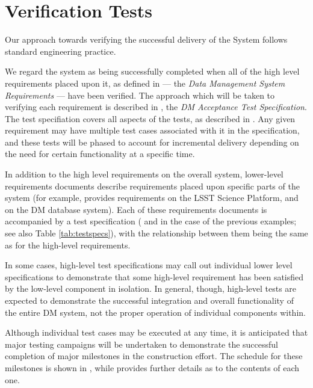 \section{Verification Tests \label{sect:approach}}

Our approach towards verifying the successful delivery of the \product{} System follows standard engineering practice.

We regard the system as being successfully completed when all of the high level requirements placed upon it, as defined in  --- the \emph{Data Management System Requirements} --- have been verified.
The approach which will be taken to verifying each requirement is described in , the \emph{DM Acceptance Test Specification}.
The test specifiation covers all aspects of the tests, as described in .
Any given requirement may have multiple test cases associated with it in the specification, and these tests will be phased to account for incremental delivery depending on the need for certain functionality at a specific time.

In addition to the high level requirements on the overall \product{} system, lower-level requirements documents describe requirements placed upon specific parts of the system (for example,  provides requirements on the LSST Science Platform, and  on the DM database system).
Each of these requirements documents is accompanied by a test specification ( and  in the case of the previous examples; see also Table \ref{tab:testspecs}), with the relationship between them being the same as for the high-level requirements.

In some cases, high-level test specifications may call out individual lower level specifications to demonstrate that some high-level requirement has been satisfied by the low-level component in isolation.
In general, though, high-level tests are expected to demonstrate the successful integration and overall functionality of the entire DM system, not the proper operation of individual components within.

Although individual test cases may be executed at any time, it is anticipated that major testing campaigns will be undertaken to demonstrate the successful completion of major milestones in the \product{} construction effort.
The schedule for these milestones is shown in , while  provides further details as to the contents of each one.

